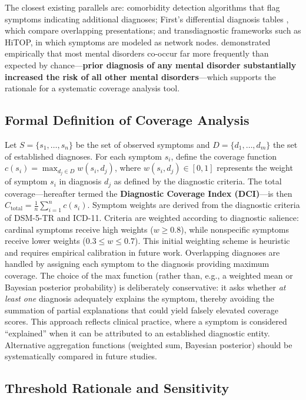 \documentclass[11pt,a4paper]{article}
\begin{document}
The closest existing parallels are: comorbidity detection algorithms that flag symptoms indicating additional diagnoses; First's differential diagnosis tables \citep{First2024}, which compare overlapping presentations; and transdiagnostic frameworks such as HiTOP, in which symptoms are modeled as network nodes. \citet{PlanaRipoll2019} demonstrated empirically that most mental disorders co-occur far more frequently than expected by chance---\textbf{prior diagnosis of any mental disorder substantially increased the risk of all other mental disorders}---which supports the rationale for a systematic coverage analysis tool.

\subsection{Formal Definition of Coverage Analysis}

Let $S = \{s_1, \ldots, s_n\}$ be the set of observed symptoms and $D = \{d_1, \ldots, d_m\}$ the set of established diagnoses. For each symptom $s_i$, define the coverage function $c(s_i) = \max_{d_j \in D} w(s_i, d_j)$, where $w(s_i, d_j) \in [0, 1]$ represents the weight of symptom $s_i$ in diagnosis $d_j$ as defined by the diagnostic criteria. The total coverage---hereafter termed the \textbf{Diagnostic Coverage Index (DCI)}---is then $C_{\text{total}} = \frac{1}{n} \sum_{i=1}^{n} c(s_i)$. Symptom weights are derived from the diagnostic criteria of DSM-5-TR and ICD-11. Criteria are weighted according to diagnostic salience: cardinal symptoms receive high weights ($w \geq 0.8$), while nonspecific symptoms receive lower weights ($0.3 \leq w \leq 0.7$). This initial weighting scheme is heuristic and requires empirical calibration in future work. Overlapping diagnoses are handled by assigning each symptom to the diagnosis providing maximum coverage. The choice of the max function (rather than, e.g., a weighted mean or Bayesian posterior probability) is deliberately conservative: it asks whether \textit{at least one} diagnosis adequately explains the symptom, thereby avoiding the summation of partial explanations that could yield falsely elevated coverage scores. This approach reflects clinical practice, where a symptom is considered ``explained'' when it can be attributed to an established diagnostic entity. Alternative aggregation functions (weighted sum, Bayesian posterior) should be systematically compared in future studies.

\subsection{Threshold Rationale and Sensitivity}
\end{document}
